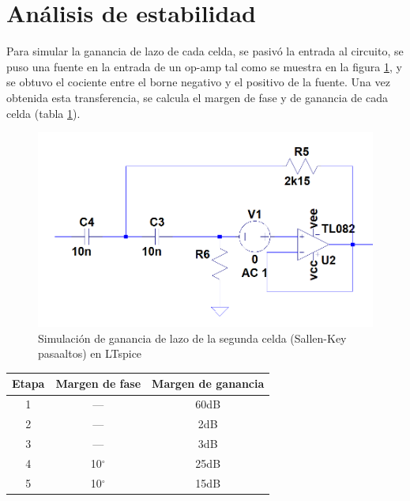 \section{An\'alisis de estabilidad}

Para simular la ganancia de lazo de cada celda, se pasiv\'o la entrada al circuito, se puso una fuente en la entrada de un op-amp tal como se muestra en la figura \ref{fig:loop_gain_sim}, y se obtuvo el cociente entre el borne negativo y el positivo de la fuente. Una vez obtenida esta transferencia, se calcula el margen de fase y de ganancia de cada celda (tabla \ref{tab:margenes_estabilidad}).

\begin{figure}[H]
	\centering
	\includegraphics[scale=0.5]{imagenes/loop_gain_sim}
	\caption{Simulaci\'on de ganancia de lazo de la segunda celda (Sallen-Key pasaaltos) en LTspice}
	\label{fig:loop_gain_sim}
\end{figure}

\begin{table}[H]
	\centering
	\begin{tabular}{||c c c||}
	\hline 
	Etapa & Margen de fase & Margen de ganancia \\ 
	\hline 
	\hline
	1 & --- & 60dB \\ 
	
	2 & --- & 2dB \\ 
	
	3 & --- & 3dB \\ 
	
	4 & 10$^\circ$ &  25dB\\ 
	
	5 & 10$^\circ$ & 15dB \\ 
	\hline
	\end{tabular} 
	\label{tab:margenes_estabilidad}
\end{table}

